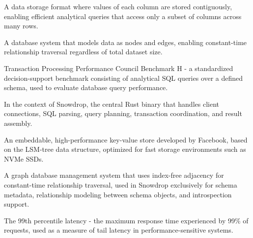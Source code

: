 \begin{description}[style=multiline, labelwidth=5cm, leftmargin=5.5cm]
  \item[Columnar Storage]
       A data storage format where values of each column are stored contiguously, enabling efficient analytical queries that access only a subset of columns across many rows.

  \item[Graph Database]
       A database system that models data as nodes and edges, enabling constant-time relationship traversal regardless of total dataset size.

  \item[TPC-H]
       Transaction Processing Performance Council Benchmark H - a standardized decision-support benchmark consisting of analytical SQL queries over a defined schema, used to evaluate database query performance.

  \item[Orchestrator]
       In the context of Snowdrop, the central Rust binary that handles client connections, SQL parsing, query planning, transaction coordination, and result assembly.

  \item[RocksDB]
       An embeddable, high-performance key-value store developed by Facebook, based on the LSM-tree data structure, optimized for fast storage environments such as NVMe SSDs.

  \item[Neo4j]
       A graph database management system that uses index-free adjacency for constant-time relationship traversal, used in Snowdrop exclusively for schema metadata, relationship modeling between schema objects, and introspection support.

  \item[p99 Latency]
       The 99th percentile latency - the maximum response time experienced by 99\% of requests, used as a measure of tail latency in performance-sensitive systems.

\end{description}
